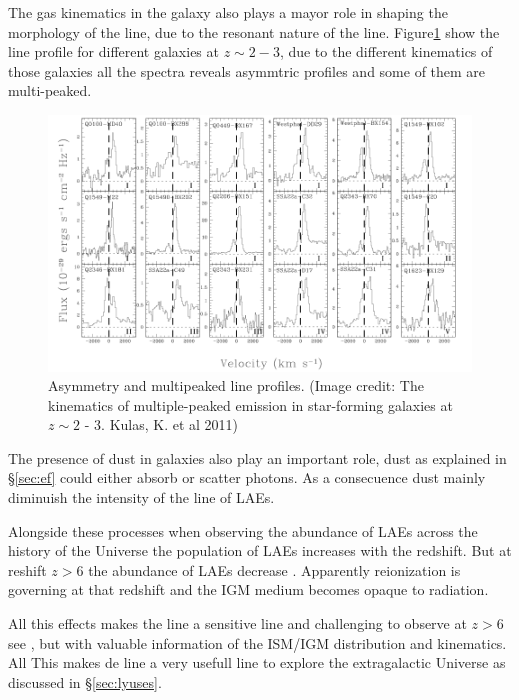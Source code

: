 The gas kinematics in the galaxy also plays a mayor role in shaping
the morphology of the line, due to the resonant nature of the line. 
Figure\ref{fig:kulas} show the \ly line
profile for different galaxies at $z \sim 2 - 3$, due to the different
kinematics of those galaxies all the spectra reveals asymmtric profiles 
and some of them are multi-peaked.    


\begin{figure}[H]\label{fig:kulas}
\begin{center}
\includegraphics[scale=0.4]{../Figures/kulas.png}
\end{center}\caption{Asymmetry and multipeaked \ly line profiles. (Image credit: The kinematics of multiple-peaked \ly emission in star-forming galaxies at $z\sim 2$ - 3. Kulas, K. et al 2011) }
\end{figure}

The presence of dust in galaxies also play an important role, dust as explained
 in \S\ref{sec:ef} could either absorb or scatter \ly photons. As a 
consecuence dust mainly diminuish the intensity of the \ly line of LAEs. 

Alongside these processes when observing the abundance of LAEs across
the history of the Universe the population of LAEs increases 
with the redshift. But at reshift $z>6$ the  
abundance of LAEs decrease \citep{Schenker12}. Apparently 
 reionization  is governing at that redshift and the IGM medium 
becomes opaque to \ly radiation.   

All this effects makes the \ly line a sensitive line and challenging
to observe at $z>6$ see \citep{Sobral15}, but with valuable information
of the ISM/IGM distribution and kinematics. All This makes de \ly
line a very usefull line to explore the extragalactic Universe as
discussed  in \S\ref{sec:lyuses}.

